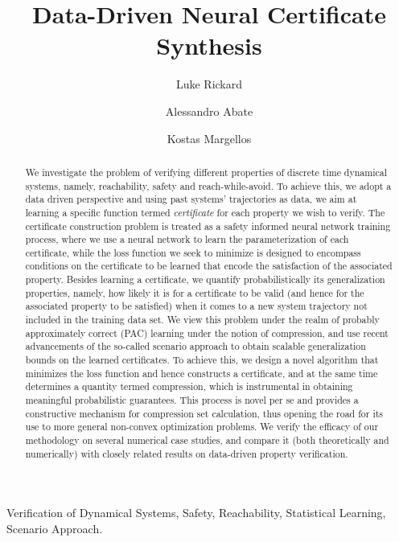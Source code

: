 \documentclass[twocolumn]{autart}    %
\newif\ifappendix
\begin{document}
\begin{frontmatter}

\title{Data-Driven Neural Certificate Synthesis}

\author[Oxford]{Luke Rickard}
\author[OxfordCS]{Alessandro Abate}
\author[Oxford]{Kostas Margellos}
\address[Oxford]{Department of Engineering Science, University of Oxford}
\address[OxfordCS]{Department of Computer Science, University of Oxford}

\begin{keyword}
    Verification of Dynamical Systems, Safety, Reachability, Statistical Learning, Scenario Approach.
\end{keyword}

\begin{abstract}
    We investigate the problem of verifying different properties of discrete time dynamical systems, namely, reachability, safety and reach-while-avoid. To achieve this, we adopt a data driven perspective and using past systems' trajectories as data, we aim at learning a specific function termed \emph{certificate} for each property we wish to verify. The certificate construction problem is treated as a safety informed neural network training process, where we use a neural network to learn the parameterization of each certificate, while the loss function we seek to minimize is designed to encompass conditions on the certificate to be learned that encode the satisfaction of the associated property. Besides learning a certificate, we quantify probabilistically its generalization properties, namely, how likely it is for a certificate to be valid (and hence for the associated property to be satisfied) when it comes to a new system trajectory not included in the training data set.
    We view this problem under the realm of probably approximately correct (PAC) learning under the notion of compression, and use recent advancements of the so-called scenario approach to obtain scalable generalization bounds on the learned certificates. To achieve this, we design a novel algorithm that minimizes the loss function and hence constructs a certificate, and at the same time determines a quantity termed compression, which is instrumental in obtaining meaningful probabilistic guarantees. This process is novel per se and provides a constructive mechanism for compression set calculation, thus opening the road for its use to more general non-convex optimization problems. We verify the efficacy of our methodology on several numerical case studies, and compare it (both theoretically and numerically) with closely related results on data-driven property verification.
\end{abstract}

\end{frontmatter}













\ifappendix
\appendix   

\fi
\end{document}
